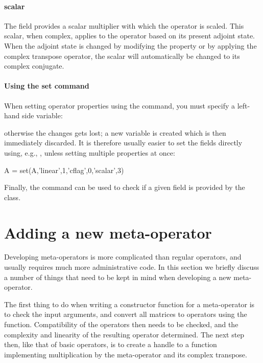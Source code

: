 \paragraph*{scalar} The  field provides a scalar
multiplier with which the operator is scaled. This scalar, when
complex, applies to the operator based on its present adjoint
state. When the adjoint state is changed by modifying the
 property or by applying the complex transpose
operator, the scalar will automatically be changed to its complex
conjugate.

\paragraph*{Using the set command} When setting operator properties
using the  command, you must specify a left-hand side
variable:
\begin{codeblock}
A = set(A,'cflag',1)}
\end{codeblock}
otherwise the changes gets lost; a new variable is created which is
then immediately discarded. It is therefore usually easier to set the
fields directly using, e.g., , unless setting
multiple properties at once:
\begin{codeblock}
A = set(A,'linear',1,'cflag',0,'scalar',3)
\end{codeblock}
Finally, the  command can be used to check if a given
field is provided by the  class.

\section{Adding a new meta-operator}\label{Sec:SparcoNewMeta}

Developing meta-operators is more complicated than regular operators,
and usually requires much more administrative code. In this section we
briefly discuss a number of things that need to be kept in mind when
developing a new meta-operator.

The first thing to do when writing a constructor function for a
meta-operator is to check the input arguments, and convert all
matrices to operators using the 
function. Compatibility of the operators then needs to be checked, and
the complexity and linearity of the resulting operator determined. The
next step then, like that of basic operators, is to create a handle to
a function implementing multiplication by the meta-operator and its
complex transpose.


